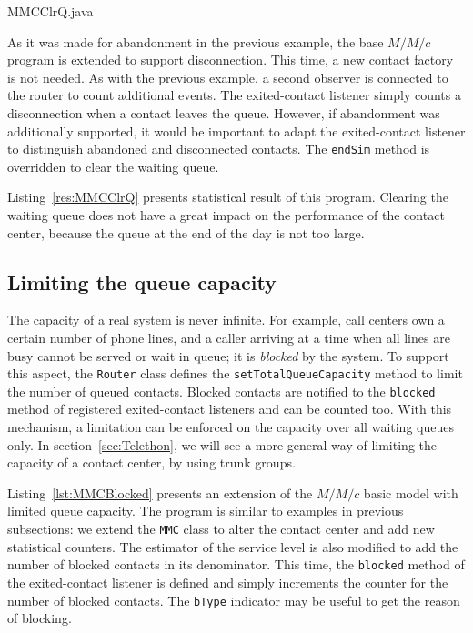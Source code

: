 
{MMCClrQ.java}



As it was made for abandonment
in the previous example, the base $M/M/c$ program is extended to
support disconnection.  This time, a new contact factory is not
needed.  As with the previous example, a second
observer is connected to the router to count additional events.
The exited-contact listener simply counts a
disconnection when a contact leaves the queue.  However, if abandonment
was additionally supported, it would be important to adapt the
exited-contact listener to distinguish abandoned and disconnected
contacts.  The \texttt{end\-Sim} method is
overridden to clear the waiting queue.

Listing~\ref{res:MMCClrQ} presents
statistical result of this program.
Clearing the waiting queue does not have a great impact on the
performance of the contact center, because the queue at
the end of the day is not too large.

\subsection{Limiting the queue capacity}
\label{sec:qclimit}

The capacity of a real system is never infinite.  For example, call
centers own a certain number of phone lines, and a caller arriving at
a time when all lines are busy cannot be served or wait in queue; it is
\emph{blocked} by the system.  To support this aspect,
the \texttt{Router} class defines the
\texttt{set\-Total\-Queue\-Capacity} method to limit the number of queued
contacts.
Blocked contacts are notified to the \texttt{blocked} method of registered
exited-contact listeners and can be counted too.  With this mechanism,
a limitation can be enforced on the
capacity over all waiting queues only.  In section~\ref{sec:Telethon},
we will
see a more general way of limiting the capacity of a contact center,
by using trunk groups.

Listing~\ref{lst:MMCBlocked} presents an extension of the $M/M/c$
basic model with limited queue capacity.  The program is similar to
examples in previous subsections: we extend the \texttt{MMC} class to
alter the contact center and add new statistical counters.  The
estimator of the service level is also modified to add the number of
blocked contacts in its denominator.
This time, the \texttt{blocked} method of the exited-contact listener
is defined and simply increments the counter for the number of blocked
contacts.  The \texttt{bType} indicator may be useful to get the
reason of blocking.

